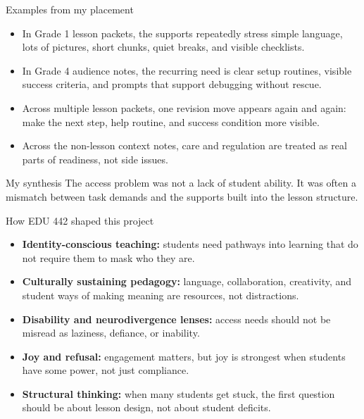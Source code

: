 \documentclass[aspectratio=169,11pt]{beamer}
\begin{document}
\begin{frame}{Examples from my placement}
\begin{itemize}
  \item In Grade 1 lesson packets, the supports repeatedly stress simple language, lots of pictures, short chunks, quiet breaks, and visible checklists.
  \item In Grade 4 audience notes, the recurring need is clear setup routines, visible success criteria, and prompts that support debugging without rescue.
  \item Across multiple lesson packets, one revision move appears again and again: make the next step, help routine, and success condition more visible.
  \item Across the non-lesson context notes, care and regulation are treated as real parts of readiness, not side issues.
\end{itemize}

\vspace{0.15cm}
\begin{alertblock}{My synthesis}
The access problem was not a lack of student ability. It was often a mismatch between task demands and the supports built into the lesson structure.
\end{alertblock}
\end{frame}

\begin{frame}{How EDU 442 shaped this project}
\begin{itemize}
  \item \textbf{Identity-conscious teaching:} students need pathways into learning that do not require them to mask who they are.
  \item \textbf{Culturally sustaining pedagogy:} language, collaboration, creativity, and student ways of making meaning are resources, not distractions.
  \item \textbf{Disability and neurodivergence lenses:} access needs should not be misread as laziness, defiance, or inability.
  \item \textbf{Joy and refusal:} engagement matters, but joy is strongest when students have some power, not just compliance.
  \item \textbf{Structural thinking:} when many students get stuck, the first question should be about lesson design, not about student deficits.
\end{itemize}
\end{frame}
\end{document}
